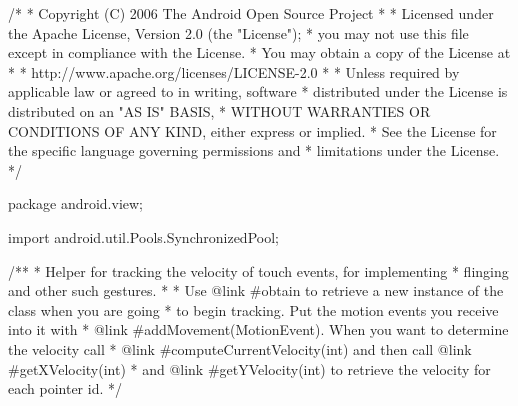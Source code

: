 /*
 * Copyright (C) 2006 The Android Open Source Project
 *
 * Licensed under the Apache License, Version 2.0 (the "License");
 * you may not use this file except in compliance with the License.
 * You may obtain a copy of the License at
 *
 *      http://www.apache.org/licenses/LICENSE-2.0
 *
 * Unless required by applicable law or agreed to in writing, software
 * distributed under the License is distributed on an "AS IS" BASIS,
 * WITHOUT WARRANTIES OR CONDITIONS OF ANY KIND, either express or implied.
 * See the License for the specific language governing permissions and
 * limitations under the License.
 */

package android.view;

import android.util.Pools.SynchronizedPool;

/**
 * Helper for tracking the velocity of touch events, for implementing
 * flinging and other such gestures.
 *
 * Use {@link #obtain} to retrieve a new instance of the class when you are going
 * to begin tracking.  Put the motion events you receive into it with
 * {@link #addMovement(MotionEvent)}.  When you want to determine the velocity call
 * {@link #computeCurrentVelocity(int)} and then call {@link #getXVelocity(int)}
 * and {@link #getYVelocity(int)} to retrieve the velocity for each pointer id.
 */
